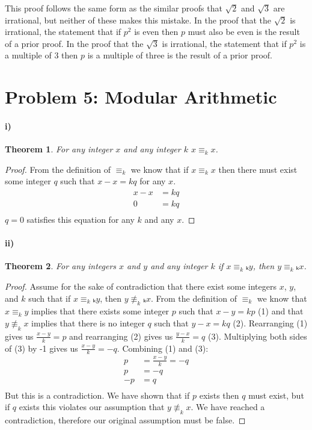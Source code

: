 \documentclass[10pt,letter]{article}
\newtheorem*{thm}{Theorem}
\begin{document}
This proof follows the same form as the similar proofs that $\sqrt{2}$ and $\sqrt{3}$ are irrational, but neither of these makes this mistake. In the proof that the $\sqrt{2}$ is irrational, the statement that if $p^2$ is even then $p$ must also be even is the result of a prior proof. In the proof that the $\sqrt{3}$ is irrational, the statement that if $p^2$ is a multiple of 3 then $p$ is a multiple of three is the result of a prior proof. 

\section*{Problem 5: Modular Arithmetic}
\paragraph{i)} 
\begin{thm}
  For any integer $x$ and any integer $k$ $x \equiv_k x$.
\end{thm}
\begin{proof}
  From the definition of $\equiv_k$ we know that if $x \equiv_k x$ then there must exist some integer $q$ such that $x - x = kq$ for any $x$.
  \begin{align*}
    x - x &= kq\\
    0 &= kq\\
  \end{align*}
  $q = 0$ satisfies this equation for any $k$ and any $x$.
\end{proof}
            
\paragraph{ii)}
\begin{thm}
  For any integers $x$ and $y$ and any integer $k$ if $x \equiv_kₖ y$, then $y \equiv_kₖ x$.
\end{thm}
\begin{proof}
  Assume for the sake of contradiction that there exist some integers $x$, $y$, and $k$ such that if $x \equiv_kₖ y$, then $y \not \equiv_kₖ x$. From the definition of $\equiv_k$ we know that $x \equiv_k y$ implies that there exists some integer $p$ such that $x - y = kp$ (1) and that $y \not \equiv_k x$ implies that there is no integer $q$ such that $y - x = kq$ (2). Rearranging (1) gives us $\frac{x-y}{k} = p$ and rearranging (2) gives us $\frac{y-x}{k} = q$ (3). Multiplying both sides of (3) by -1 gives us $\frac{x-y}{k} = -q$. Combining (1) and (3):
  \begin{align*}
    p &= \frac{x-y}{k} = -q\\
    p &= -q\\
    -p &= q\\
  \end{align*}
  But this is a contradiction. We have shown that if $p$ exists then $q$ must exist, but if $q$ exists this violates our assumption that $y \not \equiv_k x$. We have reached a contradiction, therefore our original assumption must be false.
\end{proof}
       
\end{document}
